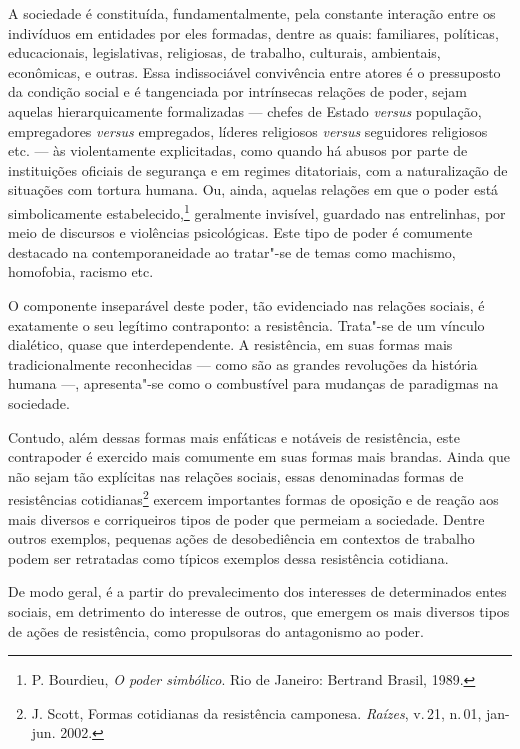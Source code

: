 
\noindent{}A sociedade é constituída, fundamentalmente, pela constante interação
entre os indivíduos em entidades por eles formadas, dentre as quais:
familiares, políticas, educacionais, legislativas, religiosas, de
trabalho, culturais, ambientais, econômicas, e outras. Essa
indissociável convivência entre atores é o pressuposto da condição
social e é tangenciada por intrínsecas relações de poder, sejam aquelas
hierarquicamente formalizadas --- chefes de Estado \textit{versus}
população, empregadores \textit{versus} empregados, líderes religiosos
\textit{versus} seguidores religiosos etc. --- às violentamente
explicitadas, como quando há abusos por parte de instituições oficiais
de segurança e em regimes ditatoriais, com a naturalização de situações
com tortura humana. Ou, ainda, aquelas relações em que o poder está
simbolicamente estabelecido,\footnote{P. Bourdieu, \textit{O poder simbólico}. Rio de Janeiro: Bertrand Brasil, 1989.} geralmente invisível,
guardado nas entrelinhas, por meio de discursos e violências
psicológicas. Este tipo de poder é comumente destacado na
contemporaneidade ao tratar"-se de temas como machismo, homofobia,
racismo etc.

O componente inseparável deste poder, tão evidenciado nas relações
sociais, é exatamente o seu legítimo contraponto: a resistência.
Trata"-se de um vínculo dialético, quase que interdependente. A
resistência, em suas formas mais tradicionalmente reconhecidas --- como
são as grandes revoluções da história humana ---, apresenta"-se como o
combustível para mudanças de paradigmas na sociedade.

Contudo, além dessas formas mais enfáticas e notáveis de resistência,
este contrapoder é exercido mais comumente em suas formas mais brandas.
Ainda que não sejam tão explícitas nas relações sociais, essas
denominadas formas de resistências cotidianas\footnote{J. Scott, Formas cotidianas da resistência camponesa. \textit{Raízes}, v.\,21, n.\,01, jan-jun. 2002.} exercem
importantes formas de oposição e de reação aos mais diversos e
corriqueiros tipos de poder que permeiam a sociedade. Dentre outros
exemplos, pequenas ações de desobediência em contextos de trabalho podem
ser retratadas como típicos exemplos dessa resistência cotidiana.

De modo geral, é a partir do prevalecimento dos interesses de
determinados entes sociais, em detrimento do interesse de outros, que
emergem os mais diversos tipos de ações de resistência, como propulsoras
do antagonismo ao poder.

